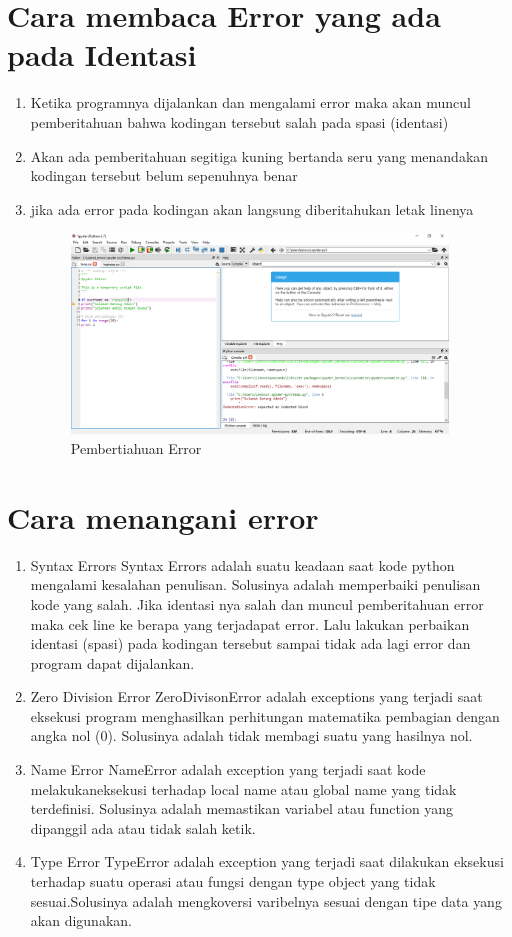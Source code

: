         \section {Cara membaca Error yang ada pada Identasi}
        \begin{enumerate}
            \item Ketika programnya dijalankan dan mengalami error maka akan muncul pemberitahuan bahwa kodingan tersebut salah pada spasi (identasi) 
            \item Akan ada pemberitahuan segitiga kuning bertanda seru yang menandakan kodingan tersebut belum sepenuhnya benar
            \item jika ada error pada kodingan akan langsung diberitahukan letak linenya 
            \begin{figure}[!htpb]
			\includegraphics[width=10cm]{figures/identi1.PNG}
				\centering
			\caption{Pembertiahuan Error}
			\end{figure}
        \end{enumerate}
        
        \section{Cara menangani error}
            \begin{enumerate}
                \item Syntax Errors Syntax Errors adalah suatu keadaan saat kode python mengalami kesalahan penulisan. Solusinya adalah memperbaiki penulisan kode yang salah. Jika identasi nya salah dan muncul pemberitahuan error maka cek line ke berapa yang terjadapat error. Lalu lakukan perbaikan identasi (spasi) pada kodingan tersebut sampai tidak ada lagi error dan program dapat dijalankan.
                \item Zero Division Error ZeroDivisonError adalah exceptions yang terjadi saat eksekusi program menghasilkan perhitungan matematika pembagian dengan angka nol (0). Solusinya adalah tidak membagi suatu yang hasilnya nol.
                \item Name Error NameError adalah exception yang terjadi saat kode melakukaneksekusi terhadap local name atau global name yang tidak terdefinisi. Solusinya adalah memastikan variabel atau function yang dipanggil ada atau tidak salah ketik.
                \item Type Error TypeError adalah exception yang terjadi saat dilakukan eksekusi terhadap suatu operasi atau fungsi dengan type object yang tidak sesuai.Solusinya adalah mengkoversi varibelnya sesuai dengan tipe data yang akan digunakan.
            \end{enumerate}
